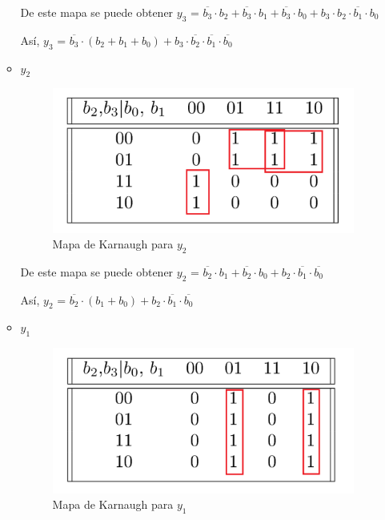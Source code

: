 \documentclass[../../informe/src/main.tex]{subfiles}
\begin{document}
\begin{enumerate}
\begin{itemize}
De este mapa se puede obtener $y_3$ = $\overline{b_{3}} \cdot b_{2} +\overline{b_{3}}\cdot b_{1} 
+\overline{b_{3}} \cdot b_{0} +b_{3}\cdot \overline{b_{2} \cdot b_{1} \cdot b_{0}} $ 
\par
Así, $y_3$ = $\overline{b_{3}} \cdot (b_{2} + b_{1} + b_{0}) + b_{3}\cdot \overline{b_{2}} \cdot \overline{b_{1}} \cdot \overline{b_{0}}$ 

\item $y_2$					

\begin{figure}[H]	%
	\centering
	\includegraphics[scale=0.4]{imagenes/karnaugh_mapa_y2.png}
	\caption{Mapa de Karnaugh para $y_2$}
	\label{fig:ej4_karnaugh_mapa_y2}
\end{figure}

De este mapa se puede obtener $y_2$ = $\overline{b_{2}} \cdot b_{1} + \overline{b_{2}} \cdot b_{0} + 
b_{2} \cdot \overline{b_{1}} \cdot \overline{b_{0}}  $ 
\par
Así, $y_2$ = $\overline{b_{2}} \cdot (b_{1} + b_{0}) + b_{2} \cdot \overline{b_{1}} \cdot \overline{b_{0}} $ 

\item $y_1$					

\begin{figure}[H]	%
	\centering
	\includegraphics[scale=0.4]{imagenes/karnaugh_mapa_y1.png}
	\caption{Mapa de Karnaugh para $y_1$}
	\label{fig:ej4_karnaugh_mapa_y1}
\end{figure}


\end{itemize}
\end{enumerate}
\end{document}
